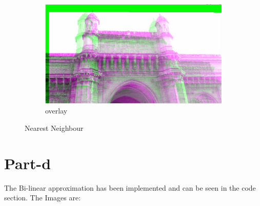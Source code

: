\documentclass[a4paper]{article}
\begin{document}
\begin{figure}[H]
\begin{subfigure}{.4\textwidth}
\end{subfigure}
\begin{subfigure}{.4\textwidth}
  \centering
  \includegraphics[width=.8\linewidth]{n-12.jpg}  
  \caption{overlay}
  
\end{subfigure}
\caption{Nearest Neighbour}

\end{figure}


\section{Part-d}
The Bi-linear approximation has been implemented and can be seen in the code section.
The Images are:
\end{document}
